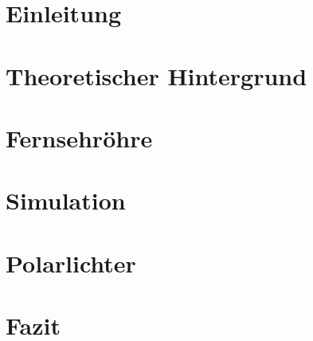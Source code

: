 \documentclass{include/thesisclass}
\begin{document}
    \FrontMatter

    
    

    \begingroup \let\clearpage\relax    %
    \tableofcontents                    %
    \listoffigures
    \listoftables
    \endgroup
    \cleardoublepage



    \MainMatter

    \chapter{Einleitung}
    \label{chap:Einleitung}
    
    \chapter{Theoretischer Hintergrund}
    \label{chap:Theorie}
    
    \chapter{Fernsehröhre}
    \label{chap:fern}
     
    \chapter{Simulation}
    \label{chap:sim}
    
    

    \chapter{Polarlichter}
    \label{chap:polar}



    \chapter{Fazit}
    \label{chap:Fazit}
    

    \Appendix
    \chapter*{\appendixname} 
\end{document}
